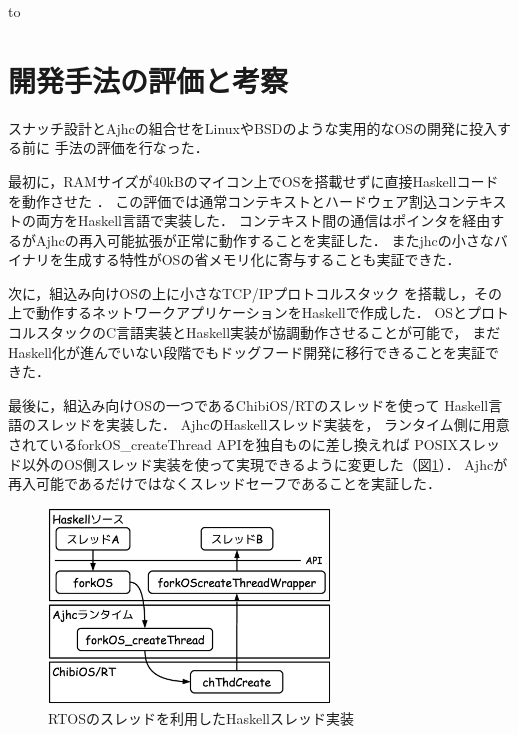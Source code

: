 \documentclass[submit,techreq,noauthor]{ipsj}
\begin{document}
\begin{table}[tb]
\caption{``hoge''と印字するプログラムに見るコンパイラの特性}
\label{tab:compilerlist}
\hbox to
\end{table}

\section{開発手法の評価と考察}

スナッチ設計とAjhcの組合せをLinuxやBSDのような実用的なOSの開発に投入する前に
手法の評価を行なった．

最初に，RAMサイズが40kBのマイコン上でOSを搭載せずに直接Haskellコードを動作させた
\cite{demo-cortex-m3}．
この評価では通常コンテキストとハードウェア割込コンテキストの両方をHaskell言語で実装した．
コンテキスト間の通信はポインタを経由するがAjhcの再入可能拡張が正常に動作することを実証した．
またjhcの小さなバイナリを生成する特性がOSの省メモリ化に寄与することも実証できた．

次に，組込み向けOSの上に小さなTCP/IPプロトコルスタック
を搭載し，その上で動作するネットワークアプリケーションをHaskellで作成した．
OSとプロトコルスタックのC言語実装とHaskell実装が協調動作させることが可能で，
まだHaskell化が進んでいない段階でもドッグフード開発に移行できることを実証できた．

最後に，組込み向けOSの一つであるChibiOS/RT\cite{chibiosrt}のスレッドを使って
Haskell言語のスレッドを実装した\cite{chibios-arafura}．
AjhcのHaskellスレッド実装を，
ランタイム側に用意されているforkOS\_createThread APIを独自ものに差し換えれば
POSIXスレッド以外のOS側スレッド実装を使って実現できるように変更した（図\ref{fig:forkos}）．
Ajhcが再入可能であるだけではなくスレッドセーフであることを実証した．

\begin{figure}[h]
\centering
\includegraphics[width=75mm]{draw/chibi_thr.eps}
\caption{RTOSのスレッドを利用したHaskellスレッド実装}
\label{fig:forkos}
\end{figure}
\end{document}
